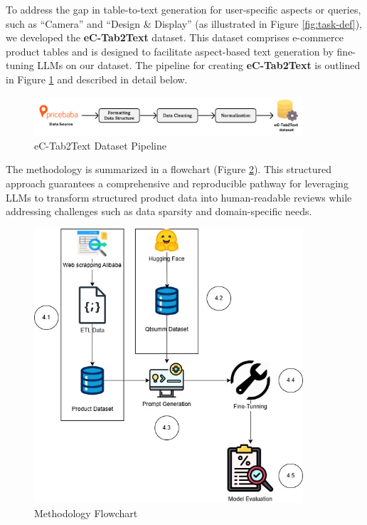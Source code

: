 To address the gap in table-to-text generation for user-specific aspects or queries, such as ``Camera'' and ``Design \& Display'' (as illustrated in Figure \ref{fig:task-def}), we developed the \textbf{eC-Tab2Text} dataset. This dataset comprises e-commerce product tables and is designed to facilitate aspect-based text generation by fine-tuning LLMs on our dataset. The pipeline for creating \textbf{eC-Tab2Text} is outlined in Figure \ref{fig:data-pipeline} and described in detail below.

\begin{figure}[H]
    \centering
    \includegraphics[width=10cm]{images/eC-Tab2Text.pdf}
    \caption{eC-Tab2Text Dataset Pipeline}
    \label{fig:data-pipeline}
\end{figure}

The methodology is summarized in a flowchart (Figure \ref{fig:MethodologyFlowchart}). This structured approach guarantees a comprehensive and reproducible pathway for leveraging LLMs to transform structured product data into human-readable reviews while addressing challenges such as data sparsity and domain-specific needs.
\begin{figure}[H]
    \centering
    \includegraphics[width=10cm]{images/Methodology.jpg}
    \caption{Methodology Flowchart}
    \label{fig:MethodologyFlowchart}
\end{figure}
